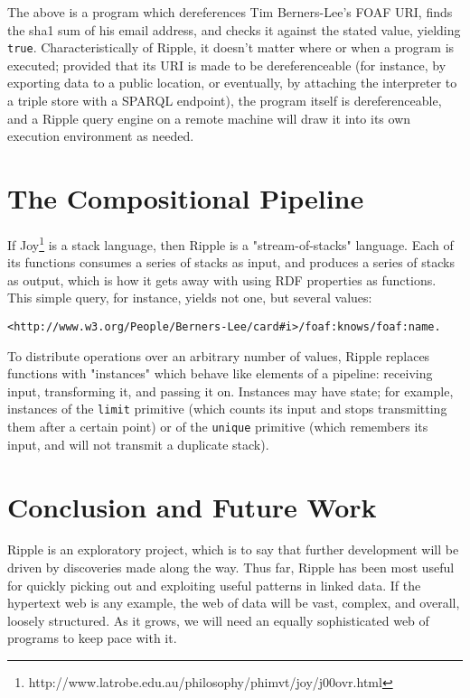\documentclass[runningheads]{llncs}
\begin{document}
The above is a program which dereferences Tim Berners-Lee's FOAF URI, finds the sha1 sum of his email address, and checks it against the stated value, yielding \texttt{true}.  Characteristically of Ripple, it doesn't matter where or when a program is executed; provided that its URI is made to be dereferenceable (for instance, by exporting data to a public location, or eventually, by attaching the interpreter to a triple store with a SPARQL endpoint), the program itself is dereferenceable, and a Ripple query engine on a remote machine will draw it into its own execution environment as needed.

\section{The Compositional Pipeline}

If Joy\footnote{http://www.latrobe.edu.au/philosophy/phimvt/joy/j00ovr.html} is a stack language, then Ripple is a "stream-of-stacks" language.  Each of its functions consumes a series of stacks as input, and produces a series of stacks as output, which is how it gets away with using RDF properties as functions.  This simple query, for instance, yields not one, but several values:

\begin{verbatim}
<http://www.w3.org/People/Berners-Lee/card#i>/foaf:knows/foaf:name.
\end{verbatim}

To distribute operations over an arbitrary number of values, Ripple replaces functions with "instances" which behave like elements of a pipeline: receiving input, transforming it, and passing it on.  Instances may have state; for example, instances of the \texttt{limit} primitive (which counts its input and stops transmitting them after a certain point) or of the \texttt{unique} primitive (which remembers its input, and will not transmit a duplicate stack).

\section{Conclusion and Future Work}

Ripple is an exploratory project, which is to say that further development will be driven by discoveries made along the way.  Thus far, Ripple has been most useful for quickly picking out and exploiting useful patterns in linked data.  If the hypertext web is any example, the web of data will be vast, complex, and overall, loosely structured.  As it grows, we will need an equally sophisticated web of programs to keep pace with it.
\end{document}
